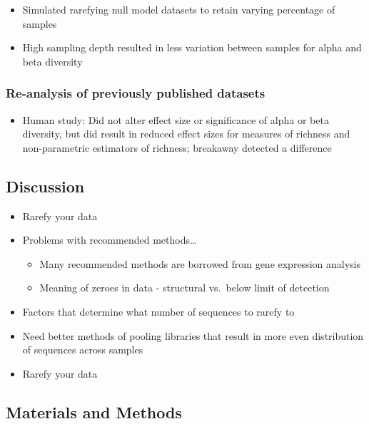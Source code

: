 \documentclass[
]{article}
\providecommand{\tightlist}{%
  \setlength{\itemsep}{0pt}\setlength{\parskip}{0pt}}
\begin{document}
\begin{itemize}
\tightlist
\item
  Simulated rarefying null model datasets to retain varying percentage
  of samples
\item
  High sampling depth resulted in less variation between samples for
  alpha and beta diversity
\end{itemize}

\hypertarget{re-analysis-of-previously-published-datasets}{%
\subsubsection{Re-analysis of previously published
datasets}\label{re-analysis-of-previously-published-datasets}}

\begin{itemize}
\tightlist
\item
  Human study: Did not alter effect size or significance of alpha or
  beta diversity, but did result in reduced effect sizes for measures of
  richness and non-parametric estimators of richness; breakaway detected
  a difference
\end{itemize}

\hypertarget{discussion}{%
\subsection{Discussion}\label{discussion}}

\begin{itemize}
\tightlist
\item
  Rarefy your data
\item
  Problems with recommended methods\ldots{}

  \begin{itemize}
  \tightlist
  \item
    Many recommended methods are borrowed from gene expression analysis
  \item
    Meaning of zeroes in data - structural vs.~below limit of detection
  \end{itemize}
\item
  Factors that determine what number of sequences to rarefy to
\item
  Need better methods of pooling libraries that result in more even
  distribution of sequences across samples
\item
  Rarefy your data
\end{itemize}

\hypertarget{materials-and-methods}{%
\subsection{Materials and Methods}\label{materials-and-methods}}
\end{document}
